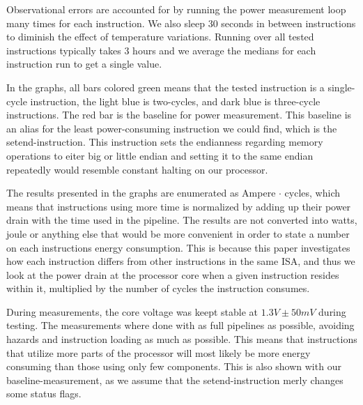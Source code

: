 Observational errors are accounted for by running the power measurement loop
many times for each instruction. We also sleep 30 seconds in between
instructions to diminish the effect of temperature variations. Running over all
tested instructions typically takes 3 hours and we average the medians for each
instruction run to get a single value.

In the graphs, all bars colored green means that the tested instruction is a
single-cycle instruction, the light blue is two-cycles, and dark blue is
three-cycle instructions. The red bar is the baseline for power measurement.
This baseline is an alias for the least power-consuming instruction we could
find, which is the {\ttfamily setend}-instruction. This instruction sets the
endianness regarding memory operations to eiter big or little
endian \cite{armcompilerref} and setting it to the same endian repeatedly would
resemble constant halting on our processor.

The results presented in the graphs are enumerated as Ampere
$\cdot$ cycles, which means that instructions using more time is normalized by
adding up their power drain with the time used in the pipeline. The results are
not converted into watts, joule or anything else that would be more convenient
in order to state a number on each instructions energy consumption. This is
because this paper investigates how each instruction differs from other
instructions in the same ISA, and thus we look at the power drain at the
processor core when a given instruction resides within it, multiplied by the
number of cycles the instruction consumes. 

During measurements, the core voltage was keept stable at
$1.3V\pm50mV$ during testing. The measurements where done with as full
pipelines as possible, avoiding hazards and instruction loading as much as
possible. This means that instructions that utilize more parts of the processor
will most likely be more energy consuming than those using only few components.
This is also shown with our {\ttfamily baseline}-measurement, as we assume that
the {\ttfamily setend}-instruction merly changes some status flags.




